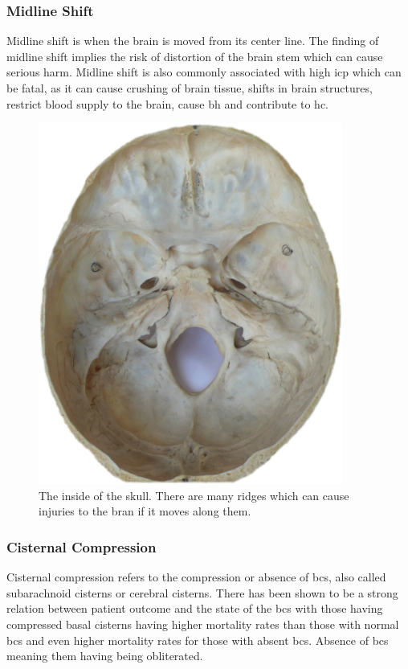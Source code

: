 \documentclass[11pt]{article}
\begin{document}
\subsubsection{Midline Shift}
Midline shift is when the brain is moved from its center line. The finding of midline shift implies the risk of distortion of the brain stem which can cause serious harm. Midline shift is also commonly associated with high \gls{icp} which can be fatal, as it can cause crushing of brain tissue, shifts in brain structures, restrict blood supply to the brain, cause \gls{bh} and contribute to \gls{hc}\cite{IntracranialPressure2021}.\cite{MidlineShift2021}

\begin{figure}[ht]
  \centering
  \includegraphics[width=10cm]{graphics/skull_interior.jpeg}
  \caption{The inside of the skull. There are many ridges which can cause injuries to the bran if it moves along them.\cite{CerebralContusion2020}}
\end{figure}

\subsubsection{Cisternal Compression}
Cisternal compression refers to the compression or absence of \glspl{bc}, also called subarachnoid cisterns or cerebral cisterns. There has been shown to be a strong relation between patient outcome and the state of the \glspl{bc} with those having compressed basal cisterns having higher mortality rates than those with normal \glspl{bc} and even higher mortality rates for those with absent \glspl{bc}\cite{toutantAbsentCompressedBasal1984}\cite{kouvarellisRelationshipBasalCisterns2011}. Absence of \glspl{bc} meaning them having being obliterated\cite{kouvarellisRelationshipBasalCisterns2011}.
\end{document}
